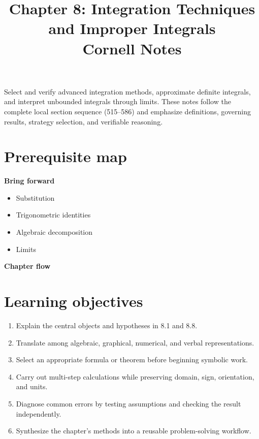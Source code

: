 \documentclass[11pt]{article}
\title{Chapter 8: Integration Techniques and Improper Integrals\\[2mm]\large Cornell Notes}
\author{}
\date{}
\begin{document}
\maketitle
\thispagestyle{fancy}
\begin{orientationbox}
Select and verify advanced integration methods, approximate definite integrals, and interpret unbounded integrals through limits. These notes follow the complete local section sequence (515--586) and emphasize definitions, governing results, strategy selection, and verifiable reasoning.
\end{orientationbox}

\section{Prerequisite map}
\begin{minipage}[t]{0.42\textwidth}
\textbf{Bring forward}
\begin{itemize}
\item Substitution
\item Trigonometric identities
\item Algebraic decomposition
\item Limits
\end{itemize}
\end{minipage}\hfill
\begin{minipage}[t]{0.54\textwidth}
\textbf{Chapter flow}
\begin{center}
\end{center}
\end{minipage}

\section{Learning objectives}
\begin{enumerate}
\item Explain the central objects and hypotheses in 8.1 and 8.8.
\item Translate among algebraic, graphical, numerical, and verbal representations.
\item Select an appropriate formula or theorem before beginning symbolic work.
\item Carry out multi-step calculations while preserving domain, sign, orientation, and units.
\item Diagnose common errors by testing assumptions and checking the result independently.
\item Synthesize the chapter's methods into a reusable problem-solving workflow.
\end{enumerate}
\end{document}
